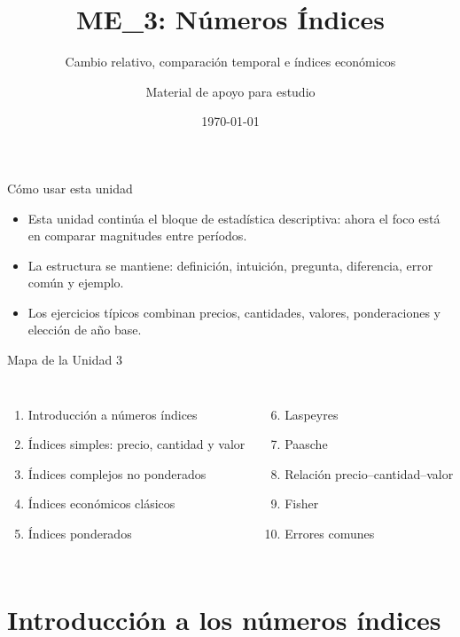 \documentclass[aspectratio=169,11pt]{beamer}
\title{ME\_3: Números Índices}
\subtitle{Cambio relativo, comparación temporal e índices económicos}
\author{Material de apoyo para estudio}
\date{\today}
\begin{document}
\begin{frame}
  \titlepage
\end{frame}

\begin{frame}{Cómo usar esta unidad}
\begin{itemize}
  \item Esta unidad continúa el bloque de estadística descriptiva: ahora el foco está en comparar magnitudes entre períodos.
  \item La estructura se mantiene: definición, intuición, pregunta, diferencia, error común y ejemplo.
  \item Los ejercicios típicos combinan precios, cantidades, valores, ponderaciones y elección de año base.
\end{itemize}
\end{frame}

\begin{frame}{Mapa de la Unidad 3}
\small
\begin{columns}[T]
\begin{enumerate}
  \item Introducción a números índices
  \item Índices simples: precio, cantidad y valor
  \item Índices complejos no ponderados
  \item Índices económicos clásicos
  \item Índices ponderados
\end{enumerate}
\begin{enumerate}\setcounter{enumi}{5}
  \item Laspeyres
  \item Paasche
  \item Relación precio--cantidad--valor
  \item Fisher
  \item Errores comunes
\end{enumerate}
\end{columns}
\end{frame}

\section{Introducción a los números índices}
\end{document}
